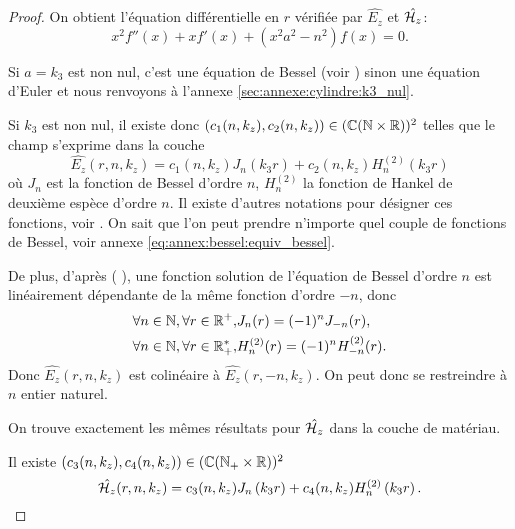 \begin{proof}
    On obtient l'équation différentielle en \(r\) vérifiée par \(\hat{E_z}\) et \(\hat{\mathcal{H}_z}\):
    \begin{equation*}
      x^2 f''(x) + xf'(x) + \left(x^2a^2 - n^2\right)f(x) = 0.
    \end{equation*}

    Si \(a = k_3\) est non nul, c'est une équation de Bessel (voir \cite[eq (6.80)]{bowman_introduction_1958}) sinon une équation d'Euler et nous renvoyons à l'annexe \ref{sec:annexe:cylindre:k3_nul}.

    Si \(k_3\) est non nul, il existe donc \((c_1(n,k_z),c_2(n,k_z)) \in (\mathbb C(\mathbb N\times\mathbb R))^2\) telles que le champ s'exprime dans la couche
    \begin{equation*}
          \hat{E_z}(r,n,k_z) = c_1(n,k_z) J_n\left(k_3r\right) + c_2(n,k_z) H_n^{(2)}\left(k_3r\right)
    \end{equation*}
    où \(J_n\) est la fonction de Bessel d'ordre \(n\), \(H_n^{(2)}\) la fonction de Hankel de deuxième espèce d'ordre \(n\). Il existe d'autres notations pour désigner ces fonctions,  voir \cite[p.~358]{abramowitz_handbook_1964}.
    On sait que l'on peut prendre n'importe quel couple de fonctions de Bessel, voir annexe \eqref{eq:annex:bessel:equiv_bessel}.

    De plus, d'après \cite[p.~358]{abramowitz_handbook_1964} ( \cite[\url{https://dlmf.nist.gov/10.4}]{dlmf_nist_2019} ), une fonction solution de l'équation de Bessel d'ordre \(n\) est linéairement dépendante de la même fonction d'ordre \(-n\), donc
    \begin{align*}
       \forall n \in \mathbb N, \forall r \in \mathbb R^+,& J_n(r) = (-1)^nJ_{-n}(r),
       \\
       \forall n \in \mathbb N, \forall r \in \mathbb R_+^*,& H_n^{(2)}(r) = (-1)^nH_{-n}^{(2)}(r).
    \end{align*}
    Donc  \(\hat{E_z}(r,n,k_z)\) est colinéaire à  \(\hat{E_z}(r,-n,k_z)\).
    On peut donc se restreindre à \(n\) entier naturel.

    On trouve exactement les mêmes résultats pour \(\hat{\mathcal{H}_z}\) dans la couche de matériau.

    Il existe \((c_3(n,k_z),c_4(n,k_z)) \in (\mathbb C(\mathbb N_+\times\mathbb R))^2\)
    \begin{equation*}
      \hat{\mathcal{H}_z}(r,n,k_z) = c_3(n,k_z) J_n\left(k_3r\right) + c_4(n,k_z) H_n^{(2)}\left(k_3r\right).
    \end{equation*}

  \end{proof}

